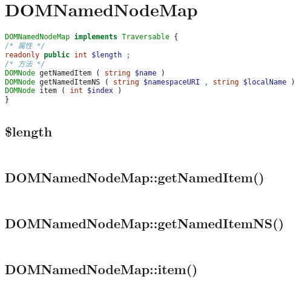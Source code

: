 \begin{lstlisting}[language=PHP]

\end{lstlisting}
\section{DOMNamedNodeMap}


\begin{lstlisting}[language=PHP]
DOMNamedNodeMap implements Traversable {
/* 属性 */
readonly public int $length ;
/* 方法 */
DOMNode getNamedItem ( string $name )
DOMNode getNamedItemNS ( string $namespaceURI , string $localName )
DOMNode item ( int $index )
}
\end{lstlisting}

\subsection{\$length}

\begin{lstlisting}[language=PHP]

\end{lstlisting}

\subsection{DOMNamedNodeMap::getNamedItem()}


\begin{lstlisting}[language=PHP]

\end{lstlisting}


\subsection{DOMNamedNodeMap::getNamedItemNS()}



\begin{lstlisting}[language=PHP]

\end{lstlisting}


\subsection{DOMNamedNodeMap::item()}



\begin{lstlisting}[language=PHP]

\end{lstlisting}


